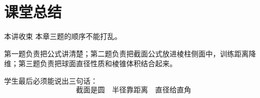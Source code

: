 \documentclass[11pt,a4paper]{ctexart}
\begin{document}
\section{课堂总结}

\begin{teachbox}{本讲收束}
本章三题的顺序不能打乱。

第一题负责把公式讲清楚；第二题负责把截面公式放进棱柱侧面中，训练距离降维；第三题负责把球面直径性质和棱锥体积结合起来。

学生最后必须能说出三句话：
\[
  \boxed{
    \text{截面是圆}
    \quad
    \text{半径靠距离}
    \quad
    \text{直径给直角}
  }
\]
\end{teachbox}
\end{document}
